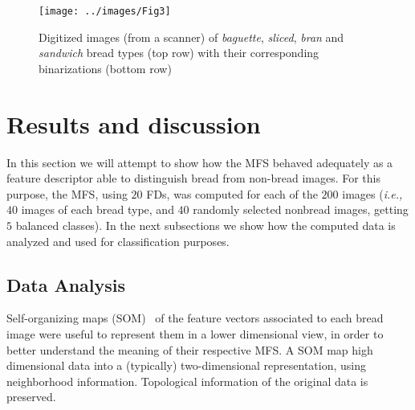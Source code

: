 \begin{figure}[htb]
\centering
\texttt{[image: ../images/Fig3]}
\caption{Digitized images (from a scanner) of {\em baguette}, {\em sliced}, {\em bran} and {\em sandwich} bread types (top row) with their corresponding binarizations (bottom row)}
\label{fig:bread}
\end{figure}


\section{Results and discussion}
\label{sec:9}

In this section we will attempt to show how the MFS behaved adequately as a feature descriptor able to distinguish bread from non-bread images. For this purpose, the MFS, using $20$ FDs, was computed for each of the $200$ images ({\em i.e.,} $40$ images of each bread type, and $40$ randomly selected nonbread images, getting $5$ balanced classes). In the next subsections we show how the computed data is analyzed and used for classification purposes.


\subsection{Data Analysis}
\label{sec:11}

Self-organizing maps (SOM)~\cite{Kohonen2001} of the feature vectors associated to each bread image were useful to represent them in a lower dimensional view, in order to better understand the meaning of their respective MFS. A SOM map high dimensional data into a (typically) two-dimensional representation, using neighborhood information. Topological information of the original data is preserved.


